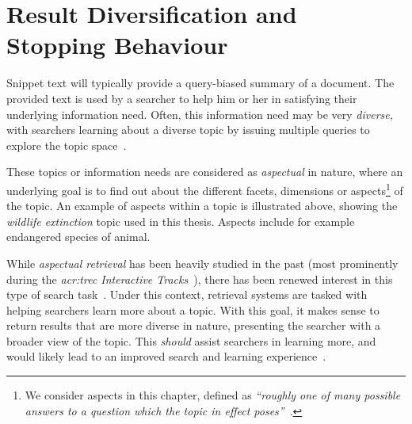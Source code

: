 
\chapter[Result Diversification and Stopping Behaviour]{Result Diversification and\\Stopping Behaviour}\label{chap:diversity}
Snippet text will typically provide a query-biased summary of a document. The provided text is used by a searcher to help him or her in satisfying their underlying information need. Often, this information need may be very \emph{diverse,} with searchers learning about a diverse topic by issuing multiple queries to explore the topic space~\citep{kelly2015search_tasks}.

\begin{figure}[h]
    \centering
    \vspace{4mm}
    \label{fig:aspectsintro}
    \vspace{-5mm}
\end{figure}

These topics or information needs are considered as \emph{aspectual} in nature, where an underlying goal is to find out about the different facets, dimensions or aspects\footnote{We consider aspects in this chapter, defined as \emph{``roughly one of many possible answers to a question which the topic in effect poses''}~\citep{over1998trec}.} of the topic. An example of aspects within a topic is illustrated above, showing the \emph{wildlife extinction} topic used in this thesis. Aspects include for example endangered species of animal.

While \emph{aspectual retrieval} has been heavily studied in the past (most prominently during the \emph{\gls{acr:trec} Interactive Tracks}~\citep{over2001trec}), there has been renewed interest in this type of search task~\citep{collins2017sal}. Under this context, retrieval systems are tasked with helping searchers learn more about a topic. With this goal, it makes sense to return results that are more diverse in nature, presenting the searcher with a broader view of the topic. This \emph{should} assist searchers in learning more, and would likely lead to an improved search and learning experience~\citep{syed2017sal}.

